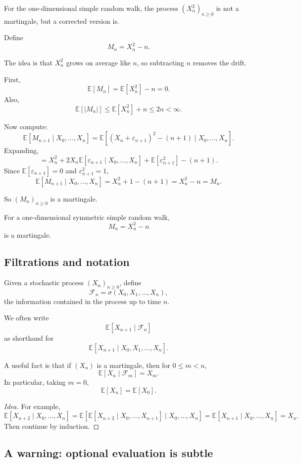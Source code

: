 \documentclass[11pt]{article}
\theoremstyle{definition}
\begin{document}
For the one-dimensional simple random walk, the process \((X_n^2)_{n\ge 0}\) is not a martingale, but a corrected version is.

Define
\[
M_n=X_n^2-n.
\]

The idea is that \(X_n^2\) grows on average like \(n\), so subtracting \(n\) removes the drift.

First,
\[
\mathbb E[M_n]=\mathbb E[X_n^2]-n=0.
\]
Also,
\[
\mathbb E[|M_n|]\le \mathbb E[X_n^2]+n\le 2n<\infty.
\]

Now compute:
\[
\mathbb E[M_{n+1}\mid X_0,\dots,X_n]
=
\mathbb E\!\left[(X_n+\varepsilon_{n+1})^2-(n+1)\mid X_0,\dots,X_n\right].
\]
Expanding,
\[
=
X_n^2+2X_n\mathbb E[\varepsilon_{n+1}\mid X_0,\dots,X_n]
+\mathbb E[\varepsilon_{n+1}^2]-(n+1).
\]
Since \(\mathbb E[\varepsilon_{n+1}]=0\) and \(\varepsilon_{n+1}^2=1\),
\[
\mathbb E[M_{n+1}\mid X_0,\dots,X_n]
=
X_n^2+1-(n+1)=X_n^2-n=M_n.
\]

So \((M_n)_{n\ge 0}\) is a martingale.

\begin{keyformula}
For a one-dimensional symmetric simple random walk,
\[
M_n=X_n^2-n
\]
is a martingale.
\end{keyformula}

\subsection{Filtrations and notation}

Given a stochastic process \((X_n)_{n\ge 0}\), define
\[
\mathcal F_n=\sigma(X_0,X_1,\dots,X_n),
\]
the information contained in the process up to time \(n\).

We often write
\[
\mathbb E[X_{n+1}\mid \mathcal F_n]
\]
as shorthand for
\[
\mathbb E[X_{n+1}\mid X_0,X_1,\dots,X_n].
\]

A useful fact is that if \((X_n)\) is a martingale, then for \(0\le m<n\),
\[
\mathbb E[X_n\mid \mathcal F_m]=X_m.
\]
In particular, taking \(m=0\),
\[
\mathbb E[X_n]=\mathbb E[X_0].
\]

\begin{proof}[Idea]
For example,
\[
\mathbb E[X_{n+2}\mid X_0,\dots,X_n]
=
\mathbb E\!\left[\mathbb E[X_{n+2}\mid X_0,\dots,X_{n+1}] \mid X_0,\dots,X_n\right]
=
\mathbb E[X_{n+1}\mid X_0,\dots,X_n]
=
X_n.
\]
Then continue by induction.
\end{proof}

\subsection{A warning: optional evaluation is subtle}
\end{document}
